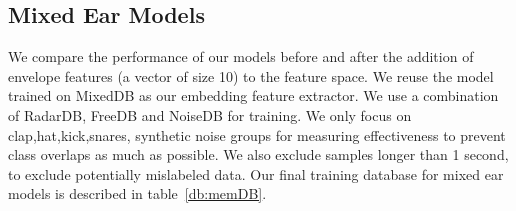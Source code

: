 \documentclass[runningheads,a4paper]{llncs}
\begin{document}
\begin{appendices}
\subsection{Mixed Ear Models}
\label{chap3:mixed_ear_models}

 We compare the performance of our models before and after the addition of envelope features (a vector of size 10) to the feature space. We reuse the model trained on  MixedDB as our embedding feature extractor. We use a combination of RadarDB, FreeDB and NoiseDB for training. We only focus on clap,hat,kick,snares, synthetic noise groups for measuring effectiveness to prevent class overlaps as much as possible. We also exclude samples longer than 1 second, to exclude potentially mislabeled data. Our final training database for mixed ear models is described in table~\ref{db:memDB}.


\end{appendices}
\end{document}
